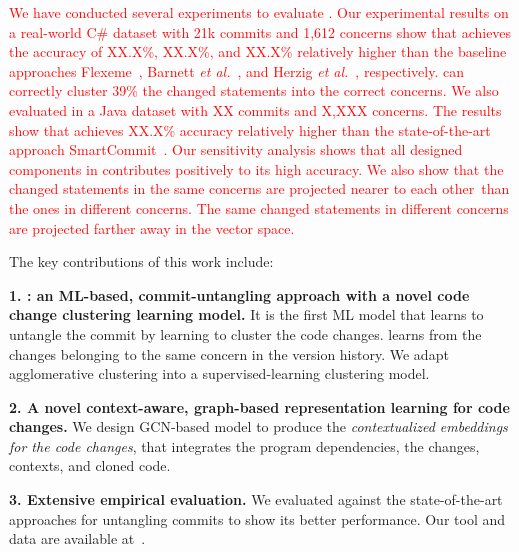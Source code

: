  \textcolor{red}{We have conducted several experiments to evaluate
    {\tool}. Our experimental results on a real-world C\# dataset with
    21k commits and 1,612 concerns show that {\tool} achieves the
    accuracy of XX.X\%, XX.X\%, and XX.X\% relatively higher than the
    baseline approaches Flexeme~\cite{flexeme-fse20}, Barnett
    {\em et al.}~\cite{barnett-icse15}, and Herzig {\em et
      al.}~\cite{kim-emse16}, respectively. {\tool} can correctly
    cluster 39\% the changed statements into the correct
    concerns.
%
  We also evaluated {\tool} in a Java dataset with XX commits and
  X,XXX concerns. The results show that {\tool} achieves XX.X\%
  accuracy relatively higher than the state-of-the-art approach
  SmartCommit~\cite{smartcommit-fse21}. Our sensitivity analysis shows
  that all designed components in {\tool} contributes positively to
  its high accuracy. We also show that the changed statements in the
  same concerns are projected nearer to each other~than the ones in
  different concerns. The same changed statements in
  different concerns are projected farther away in the vector space.}

The key contributions of this work include:

{\bf 1. {\tool}: an ML-based, commit-untangling approach with a novel
  code change clustering learning model.} It is the first ML model
that learns to untangle the commit by learning to cluster the code
changes.  {\tool} learns from the changes belonging to the same
concern in the version history. We adapt agglomerative clustering
into a supervised-learning clustering model.

{\bf 2. A novel context-aware, graph-based representation learning for
  code changes.} We design GCN-based model to produce the {\em
  contextualized embeddings for the code changes}, that
integrates the program dependencies, the changes, contexts, and cloned code.

{\bf 3. Extensive empirical evaluation.} We evaluated {\tool} against
the state-of-the-art approaches for untangling commits to show its better
performance. Our tool and data are available at~\cite{utango-website}.

